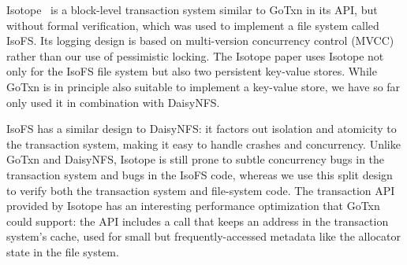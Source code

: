 Isotope~\cite{shin:isotope} is a block-level transaction system similar to GoTxn
in its API, but without formal verification, which was used to implement a file
system called IsoFS. Its logging design is based on
multi-version concurrency control (MVCC) rather than our use of pessimistic
locking. The Isotope paper uses Isotope not only for the IsoFS file system but
also two persistent key-value stores. While GoTxn is in principle also suitable to implement a
key-value store, we have so far only used it in combination with DaisyNFS.\@

IsoFS has a similar design to DaisyNFS: it factors out isolation and atomicity to the transaction
system, making it easy to handle crashes and concurrency. Unlike GoTxn and
DaisyNFS, Isotope is still prone to subtle concurrency bugs in the transaction
system and bugs in the IsoFS code, whereas we use this split design to verify
both the transaction system and file-system code. The transaction API provided
by Isotope has an interesting performance optimization that GoTxn could support:
the API includes a  call that keeps an address in the
transaction system's cache, used for small but frequently-accessed metadata like
the allocator state in the file system.
